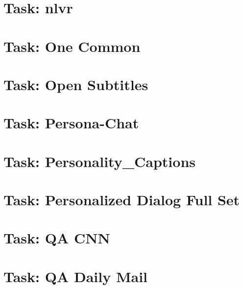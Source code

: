 \documentclass[twoside]{book}
\newcommand{\+}{\discretionary{\mbox{\scriptsize$\hookleftarrow$}}{}{}}
\begin{document}
\chapter{Task\+: nlvr}
\label{md_parlai_tasks_nlvr_README}

\chapter{Task\+: One Common}
\label{md_parlai_tasks_onecommon_README}

\chapter{Task\+: Open Subtitles}
\label{md_parlai_tasks_opensubtitles_README}

\chapter{Task\+: Persona-\/\+Chat}
\label{md_parlai_tasks_personachat_README}

\chapter{Task\+: Personality\+\_\+\+Captions}
\label{md_parlai_tasks_personality_captions_README}

\chapter{Task\+: Personalized Dialog Full Set}
\label{md_parlai_tasks_personalized_dialog_README}

\chapter{Task\+: QA C\+NN}
\label{md_parlai_tasks_qacnn_README}

\chapter{Task\+: QA Daily Mail}
\label{md_parlai_tasks_qadailymail_README}

\end{document}
